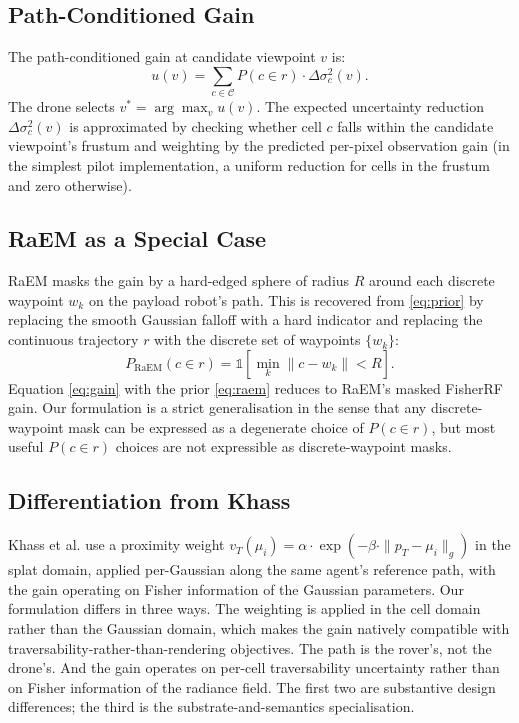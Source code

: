 \documentclass[conference]{IEEEtran}
\begin{document}
\subsection{Path-Conditioned Gain}
The path-conditioned gain at candidate viewpoint $v$ is:
\begin{equation}
u(v) = \sum_{c \in \mathcal{C}} P(c \in r) \cdot \Delta\sigma^2_c(v).
\label{eq:gain}
\end{equation}
The drone selects $v^* = \arg\max_v u(v)$. The expected uncertainty reduction $\Delta\sigma^2_c(v)$ is approximated by checking whether cell $c$ falls within the candidate viewpoint's frustum and weighting by the predicted per-pixel observation gain (in the simplest pilot implementation, a uniform reduction for cells in the frustum and zero otherwise).

\subsection{RaEM as a Special Case}
RaEM \cite{raem} masks the gain by a hard-edged sphere of radius $R$ around each discrete waypoint $w_k$ on the payload robot's path. This is recovered from \eqref{eq:prior} by replacing the smooth Gaussian falloff with a hard indicator and replacing the continuous trajectory $r$ with the discrete set of waypoints $\{w_k\}$:
\begin{equation}
P_{\text{RaEM}}(c \in r) = \mathbb{1}\left[\min_k \|c - w_k\| < R\right].
\label{eq:raem}
\end{equation}
Equation \eqref{eq:gain} with the prior \eqref{eq:raem} reduces to RaEM's masked FisherRF gain. Our formulation is a strict generalisation in the sense that any discrete-waypoint mask can be expressed as a degenerate choice of $P(c \in r)$, but most useful $P(c \in r)$ choices are not expressible as discrete-waypoint masks.

\subsection{Differentiation from Khass}
Khass et al. \cite{khass} use a proximity weight $v_T(\mu_i) = \alpha \cdot \exp(-\beta \cdot \|p_T - \mu_i\|_g)$ in the splat domain, applied per-Gaussian along the same agent's reference path, with the gain operating on Fisher information of the Gaussian parameters. Our formulation differs in three ways. The weighting is applied in the cell domain rather than the Gaussian domain, which makes the gain natively compatible with traversability-rather-than-rendering objectives. The path is the rover's, not the drone's. And the gain operates on per-cell traversability uncertainty rather than on Fisher information of the radiance field. The first two are substantive design differences; the third is the substrate-and-semantics specialisation.
\end{document}
